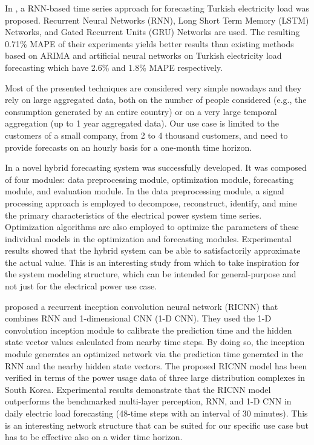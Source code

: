 In \cite{8404313}, a RNN-based time series approach for forecasting Turkish electricity load was proposed.
Recurrent Neural Networks (RNN), Long Short Term Memory (LSTM) Networks, and Gated Recurrent Units (GRU) Networks are used.
The resulting 0.71\% MAPE of their experiments yields better results than existing methods based on ARIMA and artificial neural networks on Turkish electricity load forecasting which have 2.6\% and 1.8\% MAPE respectively.

Most of the presented techniques are considered very simple nowadays and they rely on large aggregated data, both on the number of people considered (e.g., the consumption generated by an entire country) or on a very large temporal aggregation (up to 1 year aggregated data).
Our use case is limited to the customers of a small company, from 2 to 4 thousand customers, and need to provide forecasts on an hourly basis for a one-month time horizon.

In \cite{DU2018533} a novel hybrid forecasting system was successfully developed.
It was composed of four modules: data preprocessing module, optimization module, forecasting module, and evaluation module.
In the data preprocessing module, a signal processing approach is employed to decompose, reconstruct, identify, and mine the primary characteristics of the electrical power system time series.
Optimization algorithms are also employed to optimize the parameters of these individual models in the optimization and forecasting modules.
Experimental results showed that the hybrid system can be able to satisfactorily approximate the actual value.
This is an interesting study from which to take inspiration for the system modeling structure, which can be intended for general-purpose and not just for the electrical power use case.

\cite{KIM2019328} proposed a recurrent inception convolution neural network (RICNN) that combines RNN and 1-dimensional CNN (1-D CNN).
They used the 1-D convolution inception module to calibrate the prediction time and the hidden state vector values calculated from nearby time steps.
By doing so, the inception module generates an optimized network via the prediction time generated in the RNN and the nearby hidden state vectors.
The proposed RICNN model has been verified in terms of the power usage data of three large distribution complexes in South Korea.
Experimental results demonstrate that the RICNN model outperforms the benchmarked multi-layer perception, RNN, and 1-D CNN in daily electric load forecasting (48-time steps with an interval of 30 minutes).
This is an interesting network structure that can be suited for our specific use case but has to be effective also on a wider time horizon.

